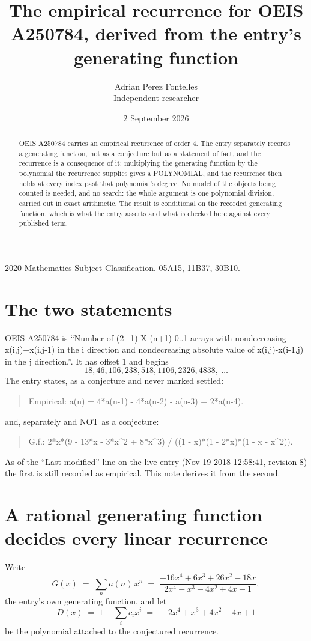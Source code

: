 \documentclass[11pt,a4paper]{article}
\title{The empirical recurrence for OEIS A250784, derived from the entry's generating function}
\author{Adrian Perez Fontelles\\ \small Independent researcher}
\date{2 September 2026}
\theoremstyle{plain}
\theoremstyle{definition}
\begin{document}
\maketitle

\begin{abstract}
OEIS A250784 carries an empirical recurrence of order $4$. The entry separately records a
generating function, not as a conjecture but as a statement of fact, and the recurrence is a
consequence of it: multiplying the generating function by the polynomial the recurrence
supplies gives a POLYNOMIAL, and the recurrence then holds at every index past that
polynomial's degree. No model of the objects being counted is needed, and no search: the
whole argument is one polynomial division, carried out in exact arithmetic. The result is
conditional on the recorded generating function, which is what the entry asserts and what is
checked here against every published term.
\end{abstract}

\noindent\small 2020 Mathematics Subject Classification. 05A15, 11B37, 30B10.\normalsize

\section{The two statements}

OEIS A250784 is ``Number of (2+1) X (n+1) 0..1 arrays with nondecreasing x(i,j)+x(i,j-1) in the i direction and nondecreasing absolute value of x(i,j)-x(i-1,j) in the j direction.''. It has offset $1$ and begins
\[
18, 46, 106, 238, 518, 1106, 2326, 4838,\ \dots
\]
The entry states, as a conjecture and never marked settled:
\begin{quote}
Empirical: a(n) = 4*a(n-1) - 4*a(n-2) - a(n-3) + 2*a(n-4).
\end{quote}
and, separately and NOT as a conjecture:
\begin{quote}
G.f.: 2*x*(9 - 13*x - 3*x\^{}2 + 8*x\^{}3) / ((1 - x)*(1 - 2*x)*(1 - x - x\^{}2)).
\end{quote}
As of the ``Last modified'' line on the live entry (Nov 19 2018 12:58:41, revision 8) the first is still
recorded as empirical. This note derives it from the second.

\section{A rational generating function decides every linear recurrence}

Write
\[
G(x)\;=\;\sum_{n}a(n)\,x^{n}\;=\;\frac{- 16 x^{4} + 6 x^{3} + 26 x^{2} - 18 x}{2 x^{4} - x^{3} - 4 x^{2} + 4 x - 1},
\]
the entry's own generating function, and let
\[
D(x)\;=\;1-\sum_i c_i x^{i}\;=\;- 2 x^{4} + x^{3} + 4 x^{2} - 4 x + 1
\]
be the polynomial attached to the conjectured recurrence.
\end{document}
